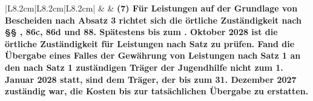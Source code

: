\documentclass[10pt,a4paper,landscape]{article}
\begin{document}
\begin{longtable}{|L{8.2cm}|L{8.2cm}|L{8.2cm}|}
\hhline{|---|}
 &  & \textbf{\textcolor{diffgreen}{(7) Für Leistungen auf der Grundlage  \newline von Bescheiden nach Absatz 3 richtet  \newline sich die örtliche Zuständigkeit nach \S{}\S{}  , 86c, 86d und 88. Spätestens bis zum  . Oktober 2028 ist die örtliche  \newline Zuständigkeit für Leistungen nach Satz   zu prüfen. Fand die Übergabe eines  \newline Falles der Gewährung von Leistungen  \newline nach Satz 1 an den nach Satz 1  \newline zuständigen Träger der Jugendhilfe  \newline nicht zum 1. Januar 2028 statt, sind dem  \newline Träger, der bis zum 31. Dezember 2027  \newline zuständig war, die Kosten bis zur  \newline tatsächlichen Übergabe zu erstatten.}} \\
\hhline{|---|}
\end{longtable}
\newpage
\end{document}

